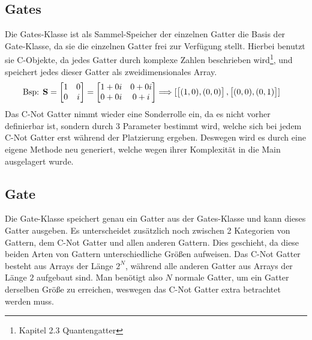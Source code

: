 \documentclass[12pt]{report}
\begin{document}
\subsection{Gates}
Die \glqq Gates\grqq{}-Klasse ist als Sammel-Speicher der einzelnen Gatter die Basis der \glqq Gate\grqq{}-Klasse, da sie die einzelnen Gatter frei zur Verfügung stellt. Hierbei benutzt sie \glqq C\grqq{}-Objekte, da jedes Gatter durch komplexe Zahlen beschrieben wird\footnote{Kapitel 2.3 Quantengatter}, und speichert jedes dieser Gatter als zweidimensionales Array.
\begin{align}
	\text{Bsp: }\textbf{S} = \begin{bmatrix} 1 & 0 \\ 0 & i \end{bmatrix} = 
	\begin{bmatrix} 1+0i & 0+0i \\ 0+0i & 0+i \end{bmatrix} &\Longrightarrow
	\begin{bmatrix}
		~\vspace{-0.5cm} \\ 
		\begin{bmatrix} (1,0) , (0,0) \end{bmatrix},
		\begin{bmatrix} (0,0) , (0,1) \end{bmatrix}
		\\ ~\vspace{-0.5cm}
	\end{bmatrix}
\end{align}
Das C-Not Gatter nimmt wieder eine Sonderrolle ein, da es nicht vorher definierbar ist, sondern durch 3 Parameter bestimmt wird, welche sich bei jedem C-Not Gatter erst während der Platzierung ergeben. Deswegen wird es durch eine eigene Methode neu generiert, welche wegen ihrer Komplexität in die Main ausgelagert wurde.

\subsection{Gate}
Die \glqq Gate\grqq{}-Klasse speichert genau ein Gatter aus der \glqq Gates\grqq{}-Klasse und kann dieses Gatter ausgeben. Es unterscheidet zusätzlich noch zwischen 2 Kategorien von Gattern, dem C-Not Gatter und allen anderen Gattern. Dies geschieht, da diese beiden Arten von Gattern unterschiedliche Größen aufweisen. Das C-Not Gatter besteht aus Arrays der Länge $2^N$, während alle anderen Gatter aus Arrays der Länge $2$ aufgebaut sind. Man benötigt also $N$ normale Gatter, um ein Gatter derselben Größe zu erreichen, weswegen das C-Not Gatter extra betrachtet werden muss.
\end{document}
